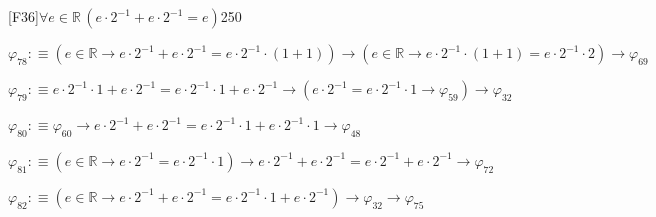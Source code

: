 \begin{fullproof}{[F36]}{$\forall e \in \mathbb{R}\,(e \cdot 2^{-1} + e \cdot 2^{-1} = e)$}{250}
\begin{abbrevlist}
\item $\varphi_{78} :\equiv (e \in \mathbb{R} \to e \cdot 2^{-1} + e \cdot 2^{-1} = e \cdot 2^{-1} \cdot (1 + 1)) \to (e \in \mathbb{R} \to e \cdot 2^{-1} \cdot (1 + 1) = e \cdot 2^{-1} \cdot 2) \to \varphi_{69}$
\item $\varphi_{79} :\equiv e \cdot 2^{-1} \cdot 1 + e \cdot 2^{-1} = e \cdot 2^{-1} \cdot 1 + e \cdot 2^{-1} \to (e \cdot 2^{-1} = e \cdot 2^{-1} \cdot 1 \to \varphi_{59}) \to \varphi_{32}$
\item $\varphi_{80} :\equiv \varphi_{60} \to e \cdot 2^{-1} + e \cdot 2^{-1} = e \cdot 2^{-1} \cdot 1 + e \cdot 2^{-1} \cdot 1 \to \varphi_{48}$
\item $\varphi_{81} :\equiv (e \in \mathbb{R} \to e \cdot 2^{-1} = e \cdot 2^{-1} \cdot 1) \to e \cdot 2^{-1} + e \cdot 2^{-1} = e \cdot 2^{-1} + e \cdot 2^{-1} \to \varphi_{72}$
\item $\varphi_{82} :\equiv (e \in \mathbb{R} \to e \cdot 2^{-1} + e \cdot 2^{-1} = e \cdot 2^{-1} \cdot 1 + e \cdot 2^{-1}) \to \varphi_{32} \to \varphi_{75}$
\end{abbrevlist}
\end{fullproof}
